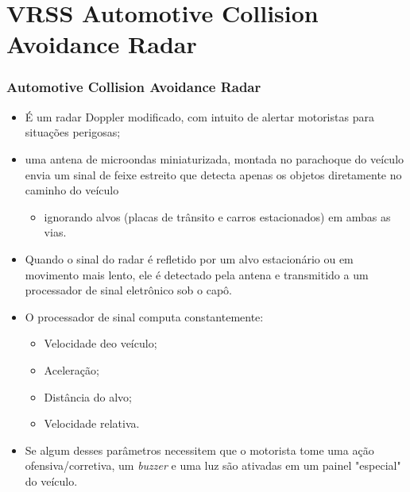 \documentclass[xcolor=dvipsnames, aspectratio=169]{beamer}
\begin{document}
\section[VRSS Automotive Collision Avoidance Radar]{VRSS Automotive Collision Avoidance Radar} 

\begin{frame}
\frametitle{Automotive Collision Avoidance Radar}
	\begin{itemize}
		\item É um radar Doppler modificado, com intuito de alertar motoristas para situações perigosas;
		\item uma antena de microondas miniaturizada, montada no parachoque do veículo envia um sinal de feixe estreito que detecta apenas os objetos diretamente no caminho do veículo
        \begin{itemize}
            \item ignorando alvos (placas de trânsito e carros estacionados) em ambas as vias.
        \end{itemize}
        \item Quando o sinal do radar é refletido por um alvo estacionário ou em movimento mais lento, ele é detectado pela antena e transmitido a um processador de sinal eletrônico sob o capô.
        \item O processador de sinal computa constantemente:
        \begin{itemize}
            \item Velocidade deo veículo;
            \item Aceleração;
            \item Distância do alvo;
            \item Velocidade relativa.
        \end{itemize}
        \item Se algum desses parâmetros necessitem que o motorista tome uma ação ofensiva/corretiva, um \textit{buzzer} e uma luz são ativadas em um painel "especial" do veículo.
        \begin{figure}
            \centering

\end{figure}
\end{itemize}
\end{frame}
\end{document}
